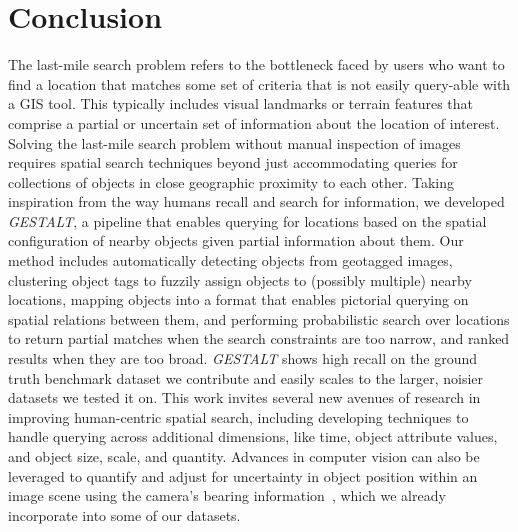 \section{Conclusion}
\label{section:conclusion}

The last-mile search problem refers to the bottleneck faced by users who want to find a location that matches some set of criteria that is not easily query-able with a GIS tool.
This typically includes visual landmarks or terrain features that comprise a partial or uncertain set of information about the location of interest.
Solving the last-mile search problem without manual inspection of images requires spatial search techniques beyond just accommodating queries for collections of objects in close geographic proximity to each other.
Taking inspiration from the way humans recall and search for information, we developed \emph{GESTALT}, a pipeline that enables querying for locations based on the spatial configuration of nearby objects given partial information about them.
Our method includes automatically detecting objects from geotagged images, clustering object tags to fuzzily assign objects to (possibly multiple) nearby locations, mapping objects into a format that enables pictorial querying on spatial relations between them, and performing probabilistic search over locations to return partial matches when the search constraints are too narrow, and ranked results when they are too broad.
\emph{GESTALT} shows high recall on the ground truth benchmark dataset we contribute and easily scales to the larger, noisier datasets we tested it on.
This work invites several new avenues of research in improving human-centric spatial search, including developing techniques to handle querying across additional dimensions, like time, object attribute values, and object size, scale, and quantity.
Advances in computer vision can also be leveraged to quantify and adjust for uncertainty in object position within an image scene using the camera's bearing information~\cite{Ming2021,Liu2020,Snavely2011,Hays2008}, which we already incorporate into some of our datasets.




